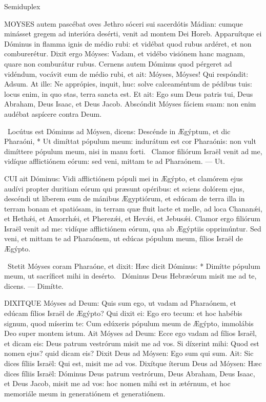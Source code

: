 
 Semiduplex





\lettrine[lines=2]{M}{OYSES} autem pascébat oves Jethro sóceri sui sacerdótis Mádian: cumque minásset gregem ad interióra desérti, venit ad montem Dei Horeb. Apparuítque ei Dóminus in flamma ignis de médio rubi: et vidébat quod rubus ardéret, et non comburerétur. Dixit ergo Móyses: Vadam, et vidébo visiónem hanc magnam, quare non comburátur rubus. Cernens autem Dóminus quod pérgeret ad vidéndum, vocávit eum de médio rubi, et ait: Móyses, Móyses! Qui respóndit: Adsum. At ille: Ne apprópies, inquit, huc: solve calceaméntum de pédibus tuis: locus enim, in quo stas, terra sancta est. Et ait: Ego sum Deus patris tui, Deus Abraham, Deus Isaac, et Deus Jacob. Abscóndit Móyses fáciem suam: non enim audébat aspícere contra Deum.

\R\ Locútus est Dóminus ad Móysen, dicens: Descénde in Ægýptum, et dic Pharaóni, * Ut dimíttat pópulum meum: indurátum est cor Pharaónis: non vult dimíttere pópulum meum, nisi in manu forti. \V\ Clamor filiórum Israël venit ad me, vidíque afflictiónem eórum: sed veni, mittam te ad Pharaónem. --- Ut.


\lettrine[lines=2]{C}{UI} ait Dóminus: Vidi afflictiónem pópuli mei in Ægýpto, et clamórem ejus audívi propter duritiam eórum qui præsunt opéribus: et sciens dolórem ejus, descéndi ut líberem eum de mánibus Ægyptiórum, et edúcam de terra illa in terram bonam et spatiósam, in terram quæ fluit lacte et melle, ad loca Chananǽi, et Hethǽi, et Amorrhǽi, et Pherezǽi, et Hevǽi, et Jebusǽi. Clamor ergo filiórum Israël venit ad me: vidíque afflictiónem eórum, qua ab Ægýptiis opprimúntur. Sed veni, et mittam te ad Pharaónem, ut edúcas pópulum meum, fílios Israël de Ægýpto.

\R\ Stetit Móyses coram Pharaóne, et dixit: Hæc dicit Dóminus: * Dimítte pópulum meum, ut sacríficet mihi in desérto. \V\ Dóminus Deus Hebræórum misit me ad te, dicens. --- Dimítte.


\lettrine[lines=2]{D}{IXITQUE} Móyses ad Deum: Quis sum ego, ut vadam ad Pharaónem, et edúcam fílios Israël de Ægýpto? Qui dixit ei: Ego ero tecum: et hoc habébis signum, quod míserim te: Cum edúxeris pópulum meum de Ægýpto, immolábis Deo super montem istum. Ait Móyses ad Deum: Ecce ego vadam ad fílios Israël, et dicam eis: Deus patrum vestrórum misit me ad vos. Si díxerint mihi: Quod est nomen ejus? quid dicam eis? Dixit Deus ad Móysen: Ego sum qui sum. Ait: Sic dices fíliis Israël: Qui est, misit me ad vos. Dixítque íterum Deus ad Móysen: Hæc dices fíliis Israël: Dóminus Deus patrum vestrórum, Deus Abraham, Deus Isaac, et Deus Jacob, misit me ad vos: hoc nomen mihi est in ætérnum, et hoc memoriále meum in generatiónem et generatiónem.

